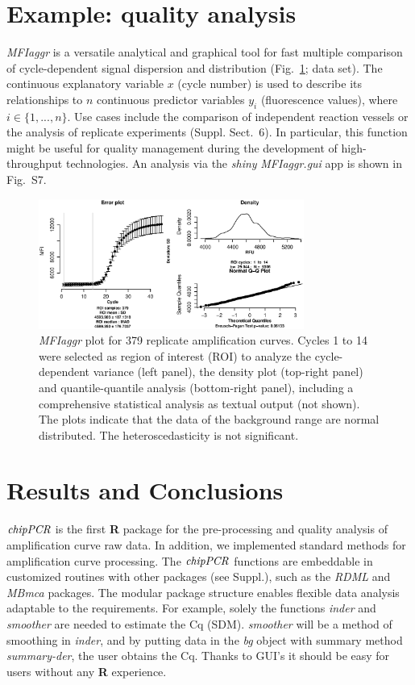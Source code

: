 \documentclass{bioinfo}
\begin{document}
\section{Example: quality analysis}

\textsl{MFIaggr} is a versatile analytical and graphical tool for fast multiple 
comparison of cycle-dependent signal dispersion and distribution 
(Fig.~\ref{fig:01}; \citet{ruijter_2013} data set). The continuous explanatory variable $x$ (cycle number) is 
used to describe its relationships to $n$ continuous predictor variables $y_i$ 
(fluorescence values), where $i \in \{1, ..., n\}$. Use cases include the 
comparison of independent reaction vessels or the analysis of replicate 
experiments (Suppl. Sect.~6). In particular, this function might be useful for 
quality management during the development of high-throughput technologies. An 
analysis via the \emph{shiny} \textsl{MFIaggr.gui} app is shown in Fig.~S7.

\begin{figure}[!tpb]%
\centerline{\includegraphics[width=8.7cm]{fig01.eps}}
\caption{\textsl{MFIaggr} plot for 379 replicate amplification curves. Cycles 1 to 14 were 
selected as region of interest (ROI) to analyze the 
cycle-dependent variance (left panel), the density plot (top-right 
panel) and quantile-quantile analysis (bottom-right panel), including a 
comprehensive statistical analysis as textual output (not shown). The plots 
indicate that the data of the background range are normal 
distributed. The heteroscedasticity is not significant.}\label{fig:01}
\end{figure}
\section{Results and Conclusions}
$\emph{chipPCR}$ is the first \textbf{R} package for the pre-processing and 
quality analysis of amplification curve raw data. In addition, we implemented 
standard methods for amplification curve processing. The $\emph{chipPCR}$ 
functions are embeddable in customized routines with other packages (see 
Suppl.), such as the \emph{RDML} and \emph{MBmca} packages. The modular package 
structure enables flexible data analysis adaptable to the requirements. For 
example, solely the functions \textsl{inder} and \textsl{smoother} are needed 
to estimate the Cq (SDM). \textsl{smoother} will be a method of smoothing in 
\textsl{inder}, and by putting data in the \textsl{bg} object with summary 
method \textsl{summary-der}, the user obtains the Cq. Thanks to GUI's it should 
be easy for users without any \textbf{R} experience.
\end{document}
